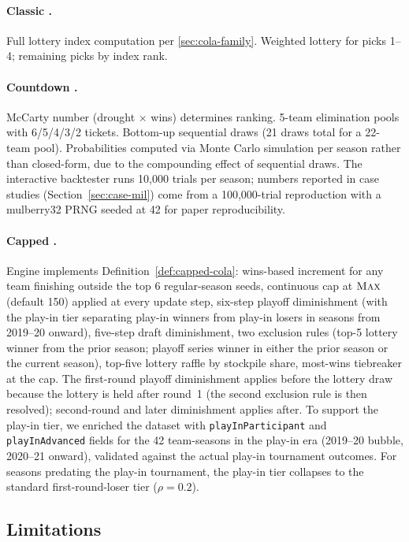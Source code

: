 \paragraph{Classic \cola{}.} Full lottery index computation per \cref{sec:cola-family}. Weighted lottery for picks 1--4; remaining picks by index rank.

\paragraph{Countdown \cola{}.} McCarty number (drought $\times$ wins) determines ranking. 5-team elimination pools with 6/5/4/3/2 tickets. Bottom-up sequential draws (21 draws total for a 22-team pool). Probabilities computed via Monte Carlo simulation per season rather than closed-form, due to the compounding effect of sequential draws. The interactive backtester runs 10{,}000 trials per season; numbers reported in case studies (Section~\ref{sec:case-mil}) come from a 100{,}000-trial reproduction with a mulberry32 PRNG seeded at 42 for paper reproducibility.

\paragraph{Capped \cola{}.} Engine implements Definition~\ref{def:capped-cola}: wins-based increment for any team finishing outside the top 6 regular-season seeds, continuous cap at $\textup{\textsc{Max}}$ (default 150) applied at every update step, six-step playoff diminishment (with the play-in tier separating play-in winners from play-in losers in seasons from 2019--20 onward), five-step draft diminishment, two exclusion rules (top-5 lottery winner from the prior season; playoff series winner in either the prior season or the current season), top-five lottery raffle by stockpile share, most-wins tiebreaker at the cap. The first-round playoff diminishment applies before the lottery draw because the lottery is held after round~1 (the second exclusion rule is then resolved); second-round and later diminishment applies after. To support the play-in tier, we enriched the dataset with \texttt{playInParticipant} and \texttt{playInAdvanced} fields for the 42 team-seasons in the play-in era (2019--20 bubble, 2020--21 onward), validated against the actual play-in tournament outcomes. For seasons predating the play-in tournament, the play-in tier collapses to the standard first-round-loser tier ($\rho = 0.2$).

\subsection{Limitations}


